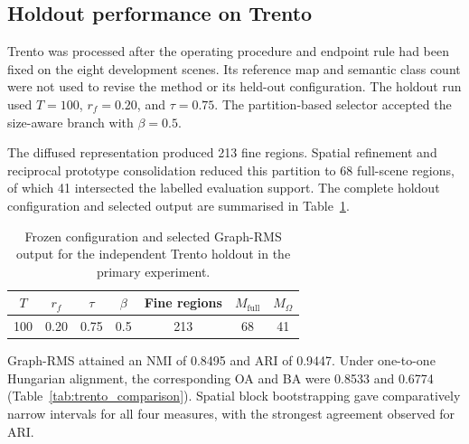 \documentclass[10pt,a4paper,fleqn]{article}
\begin{document}
\subsection{Holdout performance on Trento}
\label{subsec:trento_results}

Trento was processed after the operating procedure and endpoint rule had been
fixed on the eight development scenes. Its reference map and semantic class
count were not used to revise the method or its held-out configuration. The
holdout run used \(T=100\), \(r_f=0.20\), and \(\tau=0.75\). The partition-based selector
accepted the size-aware branch with \(\beta=0.5\).

The diffused representation produced 213 fine regions. Spatial refinement and
reciprocal prototype consolidation reduced this partition to 68 full-scene
regions, of which 41 intersected the labelled evaluation support. The complete
holdout configuration and selected output are summarised in
Table~\ref{tab:trento_configuration}.

\begin{table}[!t]
\centering
\footnotesize
\caption{Frozen configuration and selected Graph-RMS output for the
independent Trento holdout in the primary experiment.}
\label{tab:trento_configuration}

\renewcommand{\arraystretch}{1.05}
\setlength{\tabcolsep}{5pt}

\begin{tabular}{@{}ccccccc@{}}
\toprule
\(T\) &
\(r_f\) &
\(\tau\) &
\(\beta\) &
Fine regions &
\(M_{\mathrm{full}}\) &
\(M_{\Omega}\) \\
\midrule
100 & 0.20 & 0.75 & 0.5 & 213 & 68 & 41 \\
\bottomrule
\end{tabular}
\end{table}

Graph-RMS attained an NMI of 0.8495 and ARI of 0.9447. Under one-to-one
Hungarian alignment, the corresponding OA and BA were 0.8533 and 0.6774
(Table~\ref{tab:trento_comparison}). Spatial block bootstrapping gave
comparatively narrow intervals for all four measures, with the strongest
agreement observed for ARI.
\end{document}

